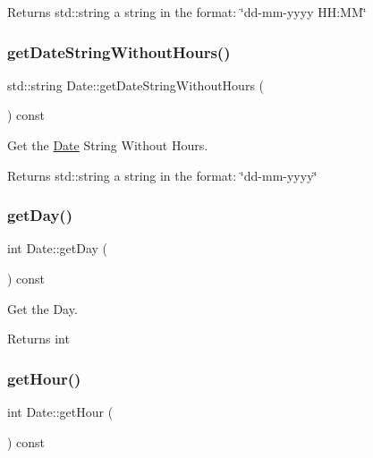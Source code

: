 \begin{DoxyReturn}{Returns}
std\+::string a string in the format\+: \char`\"{}dd-\/mm-\/yyyy H\+H\+:\+M\+M\char`\"{} 
\end{DoxyReturn}
\mbox{\label{classDate_a54b53336c8ba897fae4d2bbb0aa84a99}} 
\subsubsection{\texorpdfstring{get\+Date\+String\+Without\+Hours()}{getDateStringWithoutHours()}}
{\footnotesize\ttfamily std\+::string Date\+::get\+Date\+String\+Without\+Hours (\begin{DoxyParamCaption}{ }\end{DoxyParamCaption}) const}



Get the \mbox{\hyperlink{classDate}{Date}} String Without Hours. 

\begin{DoxyReturn}{Returns}
std\+::string a string in the format\+: \char`\"{}dd-\/mm-\/yyyy\char`\"{} 
\end{DoxyReturn}
\mbox{\label{classDate_a0f253815240e70f4c39cb93cc68bd3f4}} 
\subsubsection{\texorpdfstring{get\+Day()}{getDay()}}
{\footnotesize\ttfamily int Date\+::get\+Day (\begin{DoxyParamCaption}{ }\end{DoxyParamCaption}) const}



Get the Day. 

\begin{DoxyReturn}{Returns}
int 
\end{DoxyReturn}
\mbox{\label{classDate_ab8ea9e1aafa6cb95be7b82cda0c53cfe}} 
\subsubsection{\texorpdfstring{get\+Hour()}{getHour()}}
{\footnotesize\ttfamily int Date\+::get\+Hour (\begin{DoxyParamCaption}{ }\end{DoxyParamCaption}) const}



